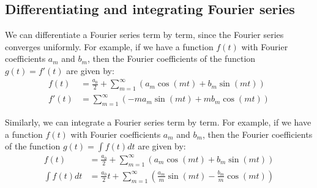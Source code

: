
\subsection{Differentiating and integrating Fourier series}
We can differentiate a Fourier series term by term, since the Fourier series converges uniformly. For example, if we have a function $f(t)$ with Fourier coefficients $a_m$ and $b_m$, then the Fourier coefficients of the function $g(t) = f'(t)$ are given by:
\begin{align*}
f(t) &= \frac{a_0}{2} + \sum_{m=1}^{\infty} \left( a_m \cos(mt) + b_m \sin(mt) \right) \\
f'(t) &= \sum_{m=1}^{\infty} \left( -m a_m \sin(mt) + m b_m \cos(mt) \right)
\end{align*}

Similarly, we can integrate a Fourier series term by term. For example, if we have a function $f(t)$ with Fourier coefficients $a_m$ and $b_m$, then the Fourier coefficients of the function $g(t) = \int f(t) dt$ are given by:
\begin{align*}
f(t) &= \frac{a_0}{2} + \sum_{m=1}^{\infty} \left( a_m \cos(mt) + b_m \sin(mt) \right) \\
\int f(t) dt &= \frac{a_0}{2} t + \sum_{m=1}^{\infty} \left( \frac{a_m}{m} \sin(mt) - \frac{b_m}{m} \cos(mt) \right)
\end{align*}


